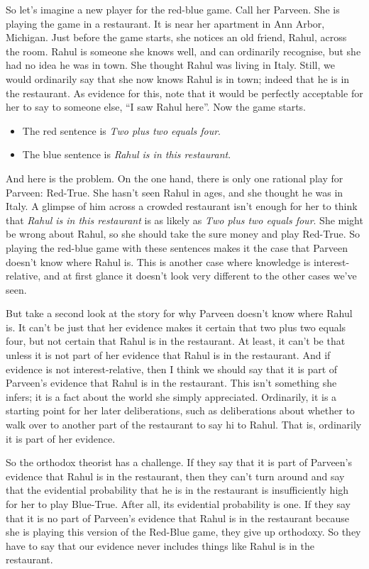 \documentclass[
  11pt,
]{book}
\providecommand{\tightlist}{%
  \setlength{\itemsep}{0pt}\setlength{\parskip}{0pt}}
\begin{document}
So let's imagine a new player for the red-blue game. Call her Parveen. She is playing the game in a restaurant. It is near her apartment in Ann Arbor, Michigan. Just before the game starts, she notices an old friend, Rahul, across the room. Rahul is someone she knows well, and can ordinarily recognise, but she had no idea he was in town. She thought Rahul was living in Italy. Still, we would ordinarily say that she now knows Rahul is in town; indeed that he is in the restaurant. As evidence for this, note that it would be perfectly acceptable for her to say to someone else, ``I saw Rahul here''. Now the game starts.

\begin{itemize}
\tightlist
\item
  The red sentence is \emph{Two plus two equals four}.
\item
  The blue sentence is \emph{Rahul is in this restaurant}.
\end{itemize}

And here is the problem. On the one hand, there is only one rational play for Parveen: Red-True. She hasn't seen Rahul in ages, and she thought he was in Italy. A glimpse of him across a crowded restaurant isn't enough for her to think that \emph{Rahul is in this restaurant} is as likely as \emph{Two plus two equals four}. She might be wrong about Rahul, so she should take the sure money and play Red-True. So playing the red-blue game with these sentences makes it the case that Parveen doesn't know where Rahul is. This is another case where knowledge is interest-relative, and at first glance it doesn't look very different to the other cases we've seen.

But take a second look at the story for why Parveen doesn't know where Rahul is. It can't be just that her evidence makes it certain that two plus two equals four, but not certain that Rahul is in the restaurant. At least, it can't be that unless it is not part of her evidence that Rahul is in the restaurant. And if evidence is not interest-relative, then I think we should say that it is part of Parveen's evidence that Rahul is in the restaurant. This isn't something she infers; it is a fact about the world she simply appreciated. Ordinarily, it is a starting point for her later deliberations, such as deliberations about whether to walk over to another part of the restaurant to say hi to Rahul. That is, ordinarily it is part of her evidence.

So the orthodox theorist has a challenge. If they say that it is part of Parveen's evidence that Rahul is in the restaurant, then they can't turn around and say that the evidential probability that he is in the restaurant is insufficiently high for her to play Blue-True. After all, its evidential probability is one. If they say that it is no part of Parveen's evidence that Rahul is in the restaurant because she is playing this version of the Red-Blue game, they give up orthodoxy. So they have to say that our evidence never includes things like Rahul is in the restaurant.
\end{document}
